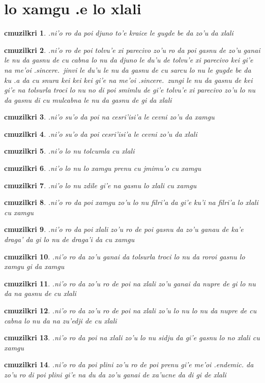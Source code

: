 \documentclass{report}
\newtheorem{cmuzilkri}{cmuzilkri}
\begin{document}
\section{lo xamgu .e lo xlali}
\begin{cmuzilkri}
	.ni'o ro da poi djuno to'e kraice le gugde be da zo'u da xlali
\end{cmuzilkri}
\begin{cmuzilkri}
	.ni'o ro de poi tolvu'e xi parecivo zo'u ro da poi gasnu de zo'u ganai le nu da gasnu de cu cabna lo nu da djuno le du'u de tolvu'e xi parecivo kei gi'e na me'oi .sincere.\ jinvi le du'u le nu da gasnu de cu sarcu lo nu le gugde be da ku .a da cu snura kei kei kei gi'e na me'oi .sincere.\ zungi le nu da gasnu de kei gi'e na tolsurla troci lo nu no di poi smimlu de gi'e tolvu'e xi parecivo zo'u lo nu da gasnu di cu mulcabna le nu da gasnu de gi da xlali
\end{cmuzilkri}
\begin{cmuzilkri}
	.ni'o su'o da poi na cesri'isi'a le cevni zo'u da xamgu
\end{cmuzilkri}
\begin{cmuzilkri}
	.ni'o su'o da poi cesri'isi'a le cevni zo'u da xlali
\end{cmuzilkri}
\begin{cmuzilkri}
	.ni'o lo nu tolcumla cu xlali
\end{cmuzilkri}
\begin{cmuzilkri}
	.ni'o lo nu lo xamgu prenu cu jmimu'o cu xamgu
\end{cmuzilkri}
\begin{cmuzilkri}
	.ni'o lo nu zdile gi'e na gasnu lo xlali cu xamgu
\end{cmuzilkri}
\begin{cmuzilkri}
	.ni'o ro da poi xamgu zo'u lo nu filri'a da gi'e ku'i na filri'a lo xlali cu xamgu
\end{cmuzilkri}
\begin{cmuzilkri}
	.ni'o ro da poi xlali zo'u ro de poi gasnu da zo'u ganau de ka'e draga' da gi lo nu de draga'i da cu xamgu
\end{cmuzilkri}
\begin{cmuzilkri}
	.ni'o ro da zo'u ganai da tolsurla troci lo nu da roroi gasnu lo xamgu gi da xamgu
\end{cmuzilkri}
\begin{cmuzilkri}
	.ni'o ro da zo'u ro de poi na xlali zo'u ganai da nupre de gi lo nu da na gasnu de cu xlali
\end{cmuzilkri}
\begin{cmuzilkri}
	.ni'o ro da zo'u ro de poi na xlali zo'u lo nu lo nu da nupre de cu cabna lo nu da na zu'edji de cu xlali
\end{cmuzilkri}
\begin{cmuzilkri}
	.ni'o ro da poi na xlali zo'u lo nu sidju da gi'e gasnu lo no xlali cu xamgu
\end{cmuzilkri}
\begin{cmuzilkri}
	.ni'o ro da poi plini zo'u ro de poi prenu gi'e me'oi .endemic. da zo'u ro di poi plini gi'e na du da zo'u ganai de xa'ucne da di gi de xlali
\end{cmuzilkri}
\end{document}
